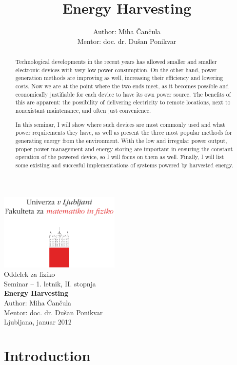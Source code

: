 \documentclass[a4paper,10pt]{article}
\title{Energy Harvesting}
\author{Author: Miha \v Can\v cula \\ Mentor: doc. dr. Du\v san Ponikvar}
\begin{document}
\begin{center}
\includegraphics[width=6cm]{./logo_fmf_uni-lj_sl}\\[0.5cm]
Oddelek za fiziko \\[2cm]
{ \large Seminar -- 1. letnik, II. stopnja } \\[1cm]
{ \huge \bf Energy Harvesting }\\[2cm]
{\large Author: Miha \v Can\v cula}\\[0.6cm]
{\large Mentor: doc. dr. Du\v san Ponikvar} \\[0.6cm]
{\large Ljubljana, januar 2012}
\end{center}
\vfill
\begin{abstract}

Technological developments in the recent years has allowed smaller and smaller electronic devices with very low power consumption. On the other hand, power generation methods are improving as well, increasing their efficiency and lowering costs. Now we are at the point where the two ends meet, as it becomes possible and economically justifiable for each device to have its own power source. The benefits of this are apparent: the possibility of delivering electricity to remote locations, next to nonexistant maintenance, and often just convenience. 

In this seminar, I will show where such devices are most commonly used and what power requirements they have, as well as present the three most popular methods for generating energy from the environment. With the low and irregular power output, proper power management and energy storing are important in ensuring the constant operation of the powered device, so I will focus on them as well. Finally, I will list some existing and succesful implementations of systems powered by harvested energy. 

\end{abstract}


\newpage
\tableofcontents

\newpage
\section{Introduction}
\end{document}
